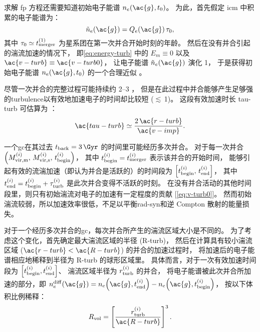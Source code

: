 求解 \ac{fp} 方程还需要知道初始电子能谱 $n_e(\ac{g}, t_0)$。
为此，首先假定 \ac{icm} 中积累的电子能谱为：
\begin{equation}
  \tilde{n}_e(\ac{g}) = Q_e(\ac{g}) \,\tau_0 ,
\end{equation}
其中 $\tau_0 \simeq t_{\mathrm{merger}}^{(1)}$ 为星系团在第一次并合开始时刻的年龄。
然后在没有并合引起的湍流加速的情况下，
即\autoref{eq:energy-turb} 中的 $E_m \equiv 0$ 以及
$\ac{v-turb} \equiv \ac{v-turb0}$，
让电子能谱 $\tilde{n}_e(\ac{g})$ 演化 \SI{1}{\Gyr}，
于是获得初始电子能谱 $n_e(\ac{g}, t_0)$ 的一个合理近似 \cite{brunetti2007}。

尽管一次并合的完整过程可能持续约 \SIrange{2}{3}{\Gyr} \cite{tormen2004,cassano2016}，
但是在此过程中并合能够产生足够强的\ac{turbulence}以有效地加速电子的时间却比较短
($\lesssim$\,\SI{1}{\Gyr})。
这段有效加速时长 \ac{tau-turb} 可估算为 \cite{miniati2015}：
\begin{equation}
  \ac{tau-turb} \simeq \frac{2\,\ac{r-turb}}{\ac{v-imp}} .
\end{equation}

一个\ac{gc}在其过去 $t_{\R{back}} = \SI{3}{\Gyr}$ 的时间里可能经历多次并合。
对于每一次并合 $\left( M^{(i)}_{\mathrm{vir,m}},\, M^{(i)}_{\mathrm{vir,s}},\,
t^{(i)}_{\mathrm{begin}} \right)$，
其中 $t^{(i)}_{\mathrm{begin}} = t^{(i)}_{\mathrm{merger}}$ 表示该并合的开始时间，
能够引起有效的流湍加速（即认为并合是活跃的）的时间段为
$\left[ t^{(i)}_{\mathrm{begin}},\, t^{(i)}_{\mathrm{end}} \right]$，
其中 $t^{(i)}_{\mathrm{end}} = t^{(i)}_{\mathrm{begin}}+\tau^{(i)}_{\mathrm{turb}}$
是此次并合变得不活跃的时刻。
在没有并合活动的其他时间段里，则只有初始湍流对电子的加速有一定程度的贡献
[\autoref{eq:v-turb0}]。
然而初始湍流较弱，所以加速效率很低，不足以平衡\ac{rad-syn}和逆 Compton 散射的能量损失。

对于一个经历多次并合的\ac{gc}，每次并合所产生的湍流区域大小是不同的。
为了考虑这个变化，首先确定最大湍流区域的半径 (\ac{R-turb})，
然后在计算具有较小湍流区域 ($\ac{r-turb} < \ac{R-turb}$) 的并合的加速过程时，
将加速后的电子能谱相应地稀释到半径为 \ac{R-turb} 的球形区域里。
具体而言，对于一次有效加速时间段为
$\left[ t^{(i)}_{\mathrm{begin}}, t^{(i)}_{\mathrm{end}} \right]$、
湍流区域半径为 $r^{(i)}_{\mathrm{turb}}$ 的并合，
将电子能谱被此次并合所加速的部分，即
$n_e^{\R{diff}}(\ac{g}) =
n_e\!\left(\ac{g}, t^{(i)}_{\R{end}}\right) -
n_e\!\left(\ac{g}, t^{(i)}_{\R{begin}}\right)$，
按以下体积比例稀释：
\begin{equation}
  \label{eq:ratio-v}
  R_{\R{vol}} = \left[ \frac{r^{(i)}_{\R{turb}}}{\ac{R-turb}} \right]^3 .
\end{equation}

